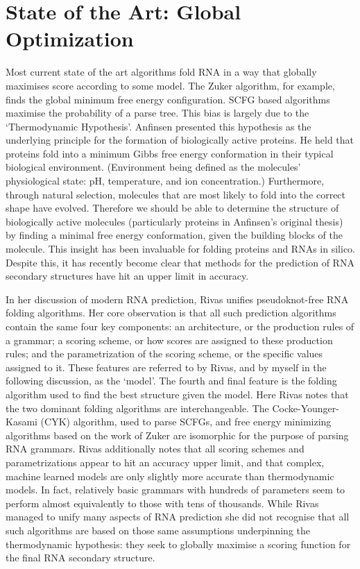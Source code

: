 \documentclass{cshonours}
\begin{document}
\section{State of the Art: Global Optimization}
\label{sec:softa}
Most current state of the art algorithms fold RNA in a way that globally maximises score according to some model. The Zuker algorithm, for example, finds the global minimum free energy configuration. SCFG based algorithms maximise the probability of a parse tree. This bias is largely due to the `Thermodynamic Hypothesis'. Anfinsen \cite{anfinsen1973principles} presented this hypothesis as the underlying principle for the formation of biologically active proteins. He held that proteins fold into a minimum Gibbs free energy conformation in their typical biological environment. (Environment being defined as the molecules' physiological state: pH, temperature, and ion concentration.) Furthermore, through natural selection, molecules that are most likely to fold into the correct shape have evolved. Therefore we should be able to determine the structure of biologically active molecules (particularly proteins in Anfinsen's original thesis) by finding a minimal free energy conformation, given the building blocks of the molecule. This insight has been invaluable for folding proteins and RNAs in silico. Despite this, it has recently become clear that methods for the prediction of RNA secondary structures have hit an upper limit in accuracy.

In her discussion of modern RNA prediction, Rivas \cite{rivas2013four} unifies pseudoknot-free RNA folding algorithms. Her core observation is that all such prediction algorithms contain the same four key components: an architecture, or the production rules of a grammar; a scoring scheme, or how scores are assigned to these production rules; and the parametrization of the scoring scheme, or the specific values assigned to it. These features are referred to by Rivas, and by myself in the following discussion, as the `model'. The fourth and final feature is the folding algorithm used to find the best structure given the model. Here Rivas notes that the two dominant folding algorithms are interchangeable. The Cocke-Younger-Kasami (CYK) algorithm, used to parse SCFGs, and free energy minimizing algorithms based on the work of Zuker are isomorphic for the purpose of parsing RNA grammars. Rivas additionally notes that all scoring schemes and parametrizations appear to hit an accuracy upper limit, and that complex, machine learned models are only slightly more accurate than thermodynamic models. In fact, relatively basic grammars with hundreds of parameters seem to perform almost equivalently to those with tens of thousands. While Rivas managed to unify many aspects of RNA prediction she did not recognise that all such algorithms are based on those same assumptions underpinning the thermodynamic hypothesis: they seek to globally maximise a scoring function for the final RNA secondary structure. 
\end{document}
